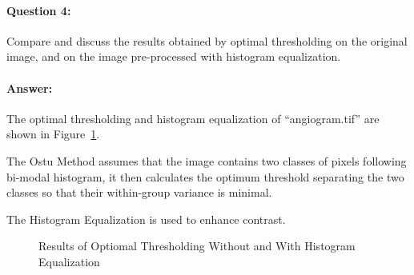 \documentclass[12pt, letter]{article}
\begin{document}
\paragraph{Question 4: } Compare and discuss the results obtained by optimal thresholding on the original image, and on the image pre-processed with histogram equalization.

\paragraph{Answer: }

The optimal thresholding and histogram equalization of ``angiogram.tif'' are shown in Figure~\ref{fig:com}. 

The Ostu Method assumes that the image contains two classes of pixels following bi-modal histogram, it then calculates the optimum threshold separating the two classes so that their within-group variance is minimal.

The Histogram Equalization is used to enhance contrast.

\begin{figure}%
	\centering
	\qquad
	\caption{Results of Optiomal Thresholding Without and With Histogram Equalization}%
	\label{fig:com}%
\end{figure}
\end{document}
